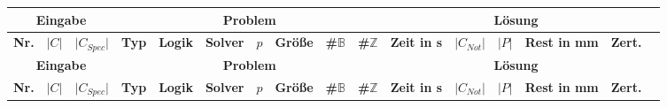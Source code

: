 \begin{landscape}
        \begin{longtable}{|c|c|c|c|c|c|c|c|c|c|c|c|c|c|c|c|}
                \hline
                \multicolumn{3}{|c|}{\textbf{Eingabe}} & \multicolumn{7}{c|}{\textbf{Problem}} & \multicolumn{5}{c|}{\textbf{Lösung}} \\
                \hline
                \textbf{Nr.} & \textbf{$\lvert C \rvert$} & \textbf{$\lvert C_{Spec} \rvert$} & \textbf{Typ} & \textbf{Logik} & \textbf{Solver} & \textbf{$p$} & \textbf{Größe} & \textbf{\#$\mathbb{B}$} & \textbf{\#$\mathbb{Z}$} & \textbf{Zeit in s} & \textbf{$\lvert C_{Not} \rvert$} & \textbf{$\lvert P \rvert$} & \textbf{Rest in mm} & \textbf{Zert.} \\
                \hline
                \endfirsthead

                \hline
                \multicolumn{3}{|c|}{\textbf{Eingabe}} & \multicolumn{7}{c|}{\textbf{Problem}} & \multicolumn{5}{c|}{\textbf{Lösung}} \\
                \hline
                \textbf{Nr.} & \textbf{$\lvert C \rvert$} & \textbf{$\lvert C_{Spec} \rvert$} & \textbf{Typ} & \textbf{Logik} & \textbf{Solver} & \textbf{$p$} & \textbf{Größe} & \textbf{\#$\mathbb{B}$} & \textbf{\#$\mathbb{Z}$} & \textbf{Zeit in s} & \textbf{$\lvert C_{Not} \rvert$} & \textbf{$\lvert P \rvert$} & \textbf{Rest in mm} & \textbf{Zert.} \\
                \hline
                \endhead


\end{longtable}
\end{landscape}
